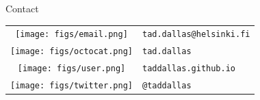 \documentclass[12pt]{beamer}
\begin{document}
\begin{frame}

{\large \textcolor{recRed}{Contact}}

  \begin{flushright}
    \begin{tabular}{cl}
    \texttt{[image: figs/email.png]} & \texttt{tad.dallas@helsinki.fi} \\
    \texttt{[image: figs/octocat.png]} & \texttt{tad.dallas} \\
    \texttt{[image: figs/user.png]} & \texttt{taddallas.github.io}\\
    \texttt{[image: figs/twitter.png]} & \texttt{@taddallas} \\
   \end{tabular}
  \end{flushright}
\end{frame}
\end{document}
